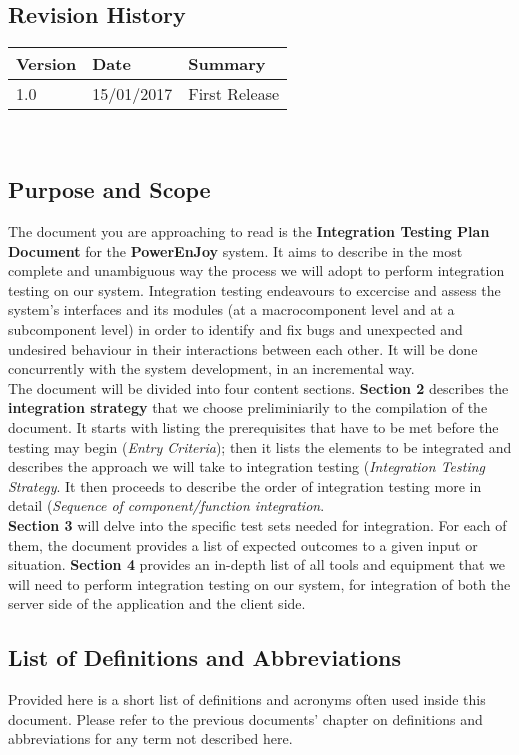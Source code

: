 \subsection{Revision History}
	\begin{tabular}{ |l|l|l| }
		\hline
		Version & Date & Summary\\ \hline
		1.0 & 15/01/2017 & First Release\\ \hline
	\end{tabular}
	\\

\subsection{Purpose and Scope}
	The document you are approaching to read is the \textbf{Integration Testing Plan Document} for the \textbf{PowerEnJoy} system. It aims to describe in the most complete and unambiguous way the process we will adopt to perform integration testing on our system. Integration testing endeavours to excercise and assess the system's interfaces and its modules (at a macrocomponent level and at a subcomponent level) in order to identify and fix bugs and unexpected and undesired behaviour in their interactions between each other. It will be done concurrently with the system development, in an incremental way.\\
	The document will be divided into four content sections. \textbf{Section 2} describes the \textbf{integration strategy} that we choose preliminiarily to the compilation of the document. It starts with listing the prerequisites that have to be met before the testing may begin (\textit{Entry Criteria}); then it lists the elements to be integrated and describes the approach we will take to integration testing (\textit{Integration Testing Strategy}. It then proceeds to describe the order of integration testing more in detail (\textit{Sequence of component/function integration}.\\
	\textbf{Section 3} will delve into the specific test sets needed for integration. For each of them, the document provides a list of expected outcomes to a given input or situation. \textbf{Section 4} provides an in-depth list of all tools and equipment that we will need to perform integration testing on our system, for integration of both the server side of the application and the client side. 

\subsection{List of Definitions and Abbreviations}
	Provided here is a short list of definitions and acronyms often used inside this document. Please refer to the previous documents' chapter on definitions and abbreviations for any term not described here.
